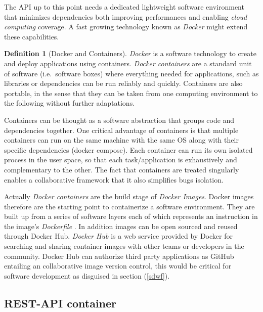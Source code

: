 \documentclass[
  12pt,
  a4paper,
  oneside]{book}
\theoremstyle{definition}
\newtheorem{definition}{Definition}[chapter]
\theoremstyle{definition}
\theoremstyle{definition}
\theoremstyle{remark}
\begin{document}
The API up to this point needs a dedicated lightweight software environment that minimizes dependencies both improving performances and enabling \emph{cloud computing} coverage. A fast growing technology known as \emph{Docker} might extend these capabilities.
\begin{definition}[Docker and Containers]
\protect\hypertarget{def:docker}{}{\label{def:docker} {} }\emph{Docker} \citep{docker} is a software technology to create and deploy applications using containers.
\emph{Docker containers} are a standard unit of software (i.e.~software boxes) where everything needed for applications, such as libraries or dependencies can be run reliably and quickly. Containers are also portable, in the sense that they can be taken from one computing environment to the following without further adaptations.
\end{definition}
Containers can be thought as a software abstraction that groups code and dependencies together. One critical advantage of containers is that multiple containers can run on the same machine with the same OS along with their specific dependencies (docker compose). Each container can run its own isolated process in the user space, so that each task/application is exhaustively and complementary to the other. The fact that containers are treated singularly enables a collaborative framework that it also simplifies bugs isolation.

Actually \emph{Docker containers} are the build stage of \emph{Docker Images}. Docker images therefore are the starting point to containerize a software environment. They are built up from a series of software layers each of which represents an instruction in the image's \emph{Dockerfile} \citeyearpar{docker_documentation_2020} . In addition images can be open sourced and reused through Docker Hub.
\emph{Docker Hub} is a web service provided by Docker for searching and sharing container images with other teams or developers in the community. Docker Hub can authorize third party applications as GitHub entailing an collaborative image version control, this would be critical for software development as disguised in section (\ref{sdwf}).

\hypertarget{dockerfile}{%
\subsection{REST-API container}\label{dockerfile}}
\end{document}
